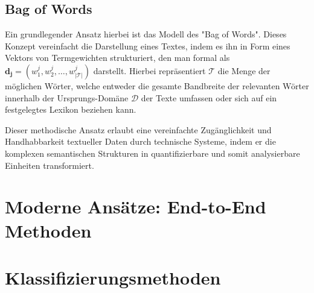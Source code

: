\subsection{Bag of Words}
Ein grundlegender Ansatz hierbei ist das Modell des "Bag of Words". Dieses Konzept vereinfacht die Darstellung eines Textes, indem es ihn in Form eines Vektors von Termgewichten strukturiert, den man formal als $ \mathbf{d_j} = (w_{1}^j, w_{2}^j, \ldots, w_{|\mathcal{T}|}^j)$ darstellt. Hierbei repräsentiert $\mathcal{T}$ die Menge der möglichen Wörter, welche entweder die gesamte Bandbreite der relevanten Wörter innerhalb der Ursprungs-Domäne $\mathcal{D}$ der Texte umfassen oder sich auf ein festgelegtes Lexikon beziehen kann.



Dieser methodische Ansatz erlaubt eine vereinfachte Zugänglichkeit und Handhabbarkeit textueller Daten durch technische Systeme, indem er die komplexen semantischen Strukturen in quantifizierbare und somit analysierbare Einheiten transformiert.


\section{Moderne Ansätze: End-to-End Methoden}



\section{Klassifizierungsmethoden}

